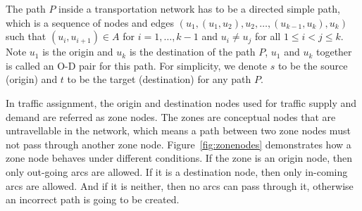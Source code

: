 The path $P$ inside a transportation network has to be a directed simple path, 
which is a sequence of nodes and edges $ (u_1, (u_1, u_2), u_2, \ldots , (u_{k-1}, u_k), u_k ) $
such that $ (u_i, u_{i+1}) \in A$ for $i = 1,\ldots,k-1$ and $u_i \neq u_j$ for all $ 1 \leq i < j \leq k$.
Note $u_1$ is the origin and $u_k$ is the destination of the path $P$, $u_1$ and $u_k$ together is called an O-D pair for this path.
For simplicity, we denote $s$ to be the source (origin) and $t$ to be the target (destination) for any path $P$.

In traffic assignment,
the origin and destination nodes used for traffic supply and demand are referred as zone nodes.
The zones are conceptual nodes that are untravellable in the network,
which means a path between two zone nodes must not pass through another zone node.
Figure~\ref{fig:zonenodes} demonstrates how a zone node behaves under different conditions.
If the zone is an origin node, then only out-going arcs are allowed.
If it is a destination node, then only in-coming arcs are allowed.
And if it is neither, then no arcs can pass through it, otherwise an incorrect path is going to be created.

